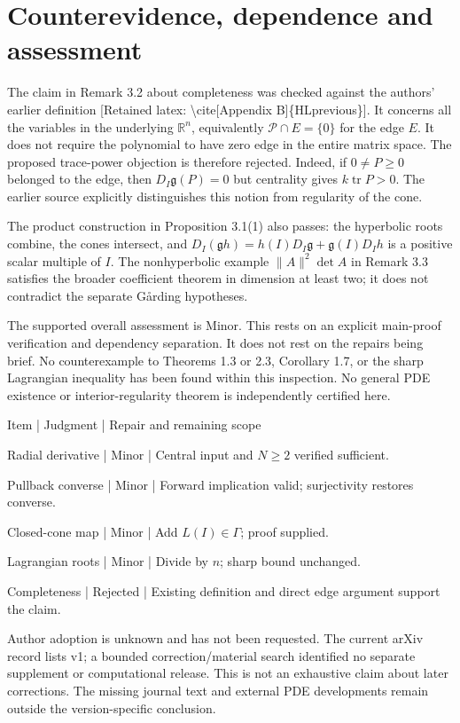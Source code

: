 \documentclass[10pt]{article}
\begin{document}
\section*{Counterevidence, dependence and assessment}
The claim in Remark 3.2 about completeness was checked against the authors’ earlier definition [Retained latex: \textbackslash{}cite[Appendix B]\{HLprevious\}]. It concerns all the variables in the underlying \(\mathbb R^n\), equivalently \(\mathcal P\cap E=\{0\}\) for the edge \(E\). It does not require the polynomial to have zero edge in the entire matrix space. The proposed trace-power objection is therefore rejected. Indeed, if \(0\neq P\geq0\) belonged to the edge, then \(D_I\mathfrak g(P)=0\) but centrality gives \(k\operatorname{tr}P>0\). The earlier source explicitly distinguishes this notion from regularity of the cone.\par
The product construction in Proposition 3.1(1) also passes: the hyperbolic roots combine, the cones intersect, and \(D_I(\mathfrak gh)=h(I)D_I\mathfrak g+\mathfrak g(I)D_Ih\) is a positive scalar multiple of \(I\). The nonhyperbolic example \(\|A\|^2\det A\) in Remark 3.3 satisfies the broader coefficient theorem in dimension at least two; it does not contradict the separate Gårding hypotheses.\par
The supported overall assessment is Minor. This rests on an explicit main-proof verification and dependency separation. It does not rest on the repairs being brief. No counterexample to Theorems 1.3 or 2.3, Corollary 1.7, or the sharp Lagrangian inequality has been found within this inspection. No general PDE existence or interior-regularity theorem is independently certified here.\par
Item | Judgment | Repair and remaining scope\par
Radial derivative | Minor | Central input and \(N\geq2\) verified sufficient.\par
Pullback converse | Minor | Forward implication valid; surjectivity restores converse.\par
Closed-cone map | Minor | Add \(L(I)\in\Gamma\); proof supplied.\par
Lagrangian roots | Minor | Divide by \(n\); sharp bound unchanged.\par
Completeness | Rejected | Existing definition and direct edge argument support the claim.\par
Author adoption is unknown and has not been requested. The current arXiv record lists v1; a bounded correction/material search identified no separate supplement or computational release. This is not an exhaustive claim about later corrections. The missing journal text and external PDE developments remain outside the version-specific conclusion.\par
\end{document}
